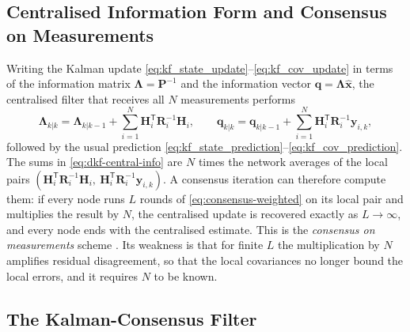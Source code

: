 \subsection{Centralised Information Form and Consensus on Measurements}
\label{subsec:mas-central-info}

Writing the Kalman update \eqref{eq:kf_state_update}--\eqref{eq:kf_cov_update} in terms of the information matrix $\mathbf{\Lambda}=\mathbf{P}^{-1}$ and the information vector $\mathbf{q}=\mathbf{\Lambda}\widehat{\mathbf{x}}$, the centralised filter that receives all $N$ measurements performs
\begin{equation}
\mathbf{\Lambda}_{k|k}=\mathbf{\Lambda}_{k|k-1}+\sum_{i=1}^{N}\mathbf{H}_i^{\mathsf T}\mathbf{R}_i^{-1}\mathbf{H}_i,\qquad
\mathbf{q}_{k|k}=\mathbf{q}_{k|k-1}+\sum_{i=1}^{N}\mathbf{H}_i^{\mathsf T}\mathbf{R}_i^{-1}\mathbf{y}_{i,k},
\label{eq:dkf-central-info}
\end{equation}
followed by the usual prediction \eqref{eq:kf_state_prediction}--\eqref{eq:kf_cov_prediction}. The sums in \eqref{eq:dkf-central-info} are $N$ times the network averages of the local pairs $(\mathbf{H}_i^{\mathsf T}\mathbf{R}_i^{-1}\mathbf{H}_i,\ \mathbf{H}_i^{\mathsf T}\mathbf{R}_i^{-1}\mathbf{y}_{i,k})$. A consensus iteration can therefore compute them: if every node runs $L$ rounds of \eqref{eq:consensus-weighted} on its local pair and multiplies the result by $N$, the centralised update is recovered exactly as $L\to\infty$, and every node ends with the centralised estimate. This is the \emph{consensus on measurements} scheme \cite{olfatisaber2005_dkf_embedded}. Its weakness is that for finite $L$ the multiplication by $N$ amplifies residual disagreement, so that the local covariances no longer bound the local errors, and it requires $N$ to be known.

\subsection{The Kalman-Consensus Filter}
\label{subsec:mas-kcf}

